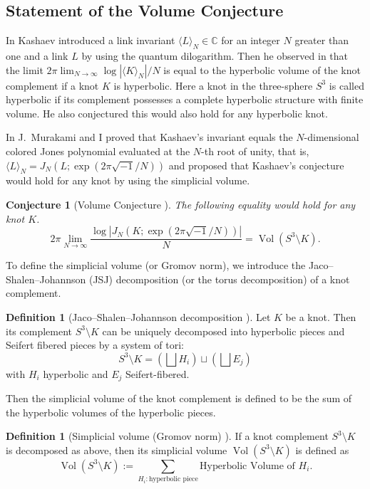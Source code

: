 \documentclass{amsart}
\newcommand{\C}{\mathbb{C}}
\newcommand{\Vol}{\operatorname{Vol}}
\newtheorem{conjecture}[theorem]{Conjecture}
\theoremstyle{definition}
\newtheorem{definition}[theorem]{Definition}
\theoremstyle{remark}
\numberwithin{equation}{section}
\begin{document}
\subsection{Statement of the Volume Conjecture}
In \cite{Kashaev:MODPLA95} Kashaev introduced a link invariant $\langle L\rangle_N\in\C$ for an integer $N$ greater than one and a link $L$ by using the quantum dilogarithm.
Then he observed in \cite{Kashaev:LETMP97} that the limit $2\pi\lim_{N\to\infty}\log|\langle K\rangle_N|/N$ is equal to the hyperbolic volume of the knot complement if a knot $K$ is hyperbolic.
Here a knot in the three-sphere $S^3$ is called hyperbolic if its complement possesses a complete hyperbolic structure with finite volume.
He also conjectured this would also hold for any hyperbolic knot.
\par
In \cite{Murakami/Murakami:ACTAM12001} J.~Murakami and I proved that Kashaev's invariant equals the $N$-dimensional colored Jones polynomial evaluated at the $N$-th root of unity, that is, $\langle L\rangle_N=J_N(L;\exp(2\pi\sqrt{-1}/N))$ and proposed that Kashaev's conjecture would hold for any knot by using the simplicial volume.
\begin{conjecture}[Volume Conjecture \cite{Kashaev:LETMP97,Murakami/Murakami:ACTAM12001}]\label{conj:VC}
The following equality would hold for any knot $K$.
\begin{equation*}
  2\pi\lim_{N\to\infty}\frac{\log|J_N(K;\exp(2\pi\sqrt{-1}/N))|}{N}
  =\Vol(S^3\setminus{K}).
\end{equation*}
\end{conjecture}
To define the simplicial volume (or Gromov norm), we introduce the Jaco--Shalen--Johannson (JSJ) decomposition (or the torus decomposition) of a knot complement.
\begin{definition}[Jaco--Shalen--Johannson decomposition \cite{Jaco/Shalen:MEMAM79,Johannson:1979}]
Let $K$ be a knot.
Then its complement $S^3\setminus{K}$ can be uniquely decomposed into hyperbolic pieces and Seifert fibered pieces by a system of tori:
\begin{equation*}
  S^3\setminus{K}
  =
  \left(\bigsqcup H_i\right)\sqcup\left(\bigsqcup E_j\right)
\end{equation*}
with $H_i$ hyperbolic and $E_j$ Seifert-fibered.
\end{definition}
Then the simplicial volume of the knot complement is defined to be the sum of the hyperbolic volumes of the hyperbolic pieces.
\begin{definition}[Simplicial volume (Gromov norm) \cite{Gromov:INSHE82}]
If a knot complement $S^3\setminus{K}$ is decomposed as above, then its simplicial volume $\Vol(S^3\setminus{K})$ is defined as
\begin{equation*}
  \Vol(S^3\setminus{K})
  :=
  \sum_{H_i:\text{hyperbolic piece}}\text{Hyperbolic Volume of $H_i$}.
\end{equation*}
\end{definition}
\end{document}
